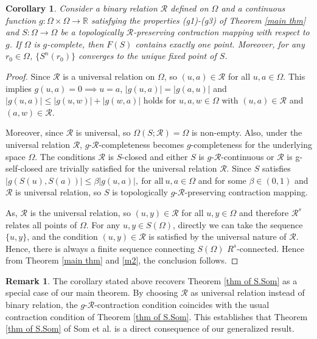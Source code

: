 \documentclass[10pt, reqno]{amsart}
\newtheorem{corollary}[theorem]{Corollary}
\theoremstyle{definition}
\newtheorem{remark}[theorem]{Remark}
\theoremstyle{remark}
\numberwithin{equation}{section}
\begin{document}
\begin{corollary} 
	Consider a binary relation $ \mathcal{R}$ defined on   $ \Omega $ and a continuous function $ g : \Omega \times \Omega \to \mathbb{R} $    satisfying the properties (g1)-(g3) of Theorem \ref{main thm} and $ S : \Omega \to \Omega $ be a    topologically $\mathcal{R}$-preserving contraction mapping with respect to $g$.  
	If $ \Omega $ is $g$-complete, then $ F ( S ) $ contains exactly one point. Moreover, for any $ r_0 \in \Omega $,   $ \{ S^n (r_0) \}  $ converges to the unique fixed point of $ S $.
\end{corollary}  
\begin{proof}
	Since $ \mathcal{R} $ is a   universal relation on $  \Omega $, so  $	( u, a ) \in \mathcal{R} $  for all 	 $ u, a \in \Omega $. This implies  $ g ( u, a ) = 0 \implies u = a $,    $ | g ( u, a ) | = | g ( a, u ) | $ and 
	 $  | g ( u, a ) | \leq | g ( u, w ) | + | g ( w, a ) | $ 	holds for    $ u, a, w \in \Omega $ with $ ( u, a ) \in \mathcal{R} $ and $ ( a, w ) \in \mathcal{R} $. 
     
     Moreover, since $\mathcal{R} $ is universal, so $  \Omega ( S; \mathcal{R} ) = \Omega $   is non-empty. Also, under the universal relation $\mathcal{R}$,  $g$-$ \mathcal{R}$-completeness becomes $g$-completeness for the underlying space $\Omega$.  The conditions   $\mathcal{R} $ is  $S $-closed and    either  $ S $ is  $g$-$ \mathcal{R}$-continuous or  $\mathcal{R} $ is  
g-self-closed are trivially satisfied   for the universal relation $\mathcal{R} $. 
Since $ S $ satisfies $ 	|g ( S ( u ), S ( a ) )| \leq \beta |g ( u, a )|, ~ \text{for all} ~ u, a \in \Omega $ and for some $ \beta \in ( 0, 1 ) $  and $\mathcal{R} $ is universal relation, so $ S $ is topologically  $g$-$ \mathcal{R}$-preserving contraction mapping. 

As, $\mathcal{R} $  is the universal relation, so $ ( u, y ) \in \mathcal{R} $  for all 
$ u, y \in \Omega $ and therefore $ \mathcal{R}^s $ relates all points of $ \Omega $.  For any $ u, y \in S ( \Omega ) $,  directly we can take the sequence  $ \{ u, y \} $, and the condition  $  ( u, y ) \in \mathcal{R} $ is satisfied by the universal nature of $ \mathcal{R}$.  Hence, there is always a finite sequence connecting    $ S ( \Omega ) $  $ R^s $-connected. 
Hence from Theorem \ref{main thm} and \ref{m2}, the conclusion follows.
 \end{proof}


\begin{remark}
    The corollary stated above recovers Theorem \ref{thm of S.Som}   as a special case of our main theorem. By choosing $  \mathcal{R} $ as universal relation instead of  binary relation, the $g$-$ \mathcal{R}$-contraction condition coincides with the usual contraction condition of Theorem \ref{thm of S.Som}. This establishes that Theorem \ref{thm of S.Som} of Som et al. \cite{S.Som} is a direct consequence of our generalized result.
\end{remark}
\end{document}
